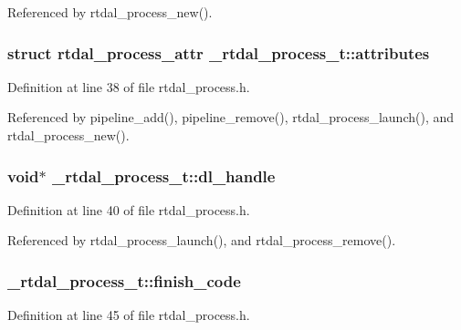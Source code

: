 Referenced by rtdal\-\_\-process\-\_\-new().

\subsubsection[{attributes}]{\setlength{\rightskip}{0pt plus 5cm}struct {\bf rtdal\-\_\-process\-\_\-attr} \-\_\-rtdal\-\_\-process\-\_\-t\-::attributes}\label{struct__rtdal__process__t_ab9d4fcf66abec2cf4495a7b6574fea52}


Definition at line 38 of file rtdal\-\_\-process.\-h.



Referenced by pipeline\-\_\-add(), pipeline\-\_\-remove(), rtdal\-\_\-process\-\_\-launch(), and rtdal\-\_\-process\-\_\-new().

\subsubsection[{dl\-\_\-handle}]{\setlength{\rightskip}{0pt plus 5cm}void$\ast$ \-\_\-rtdal\-\_\-process\-\_\-t\-::dl\-\_\-handle}\label{struct__rtdal__process__t_aa5f45d6f44b73777366345845eb1bb99}


Definition at line 40 of file rtdal\-\_\-process.\-h.



Referenced by rtdal\-\_\-process\-\_\-launch(), and rtdal\-\_\-process\-\_\-remove().

\subsubsection[{finish\-\_\-code}]{ \-\_\-rtdal\-\_\-process\-\_\-t\-::finish\-\_\-code}\label{struct__rtdal__process__t_a236ea6c8665b6072ae6b32342bded647}


Definition at line 45 of file rtdal\-\_\-process.\-h.



